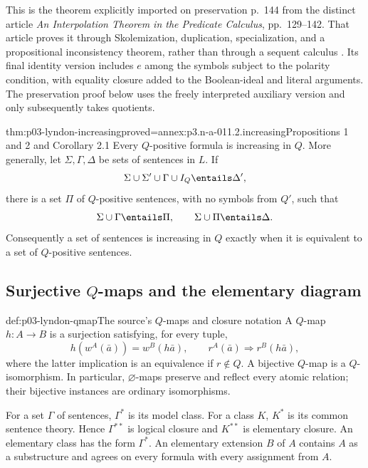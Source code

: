 This is the theorem explicitly imported on preservation p.~144 from the
distinct article \emph{An Interpolation Theorem in the Predicate Calculus},
pp.~129--142. That article proves it through Skolemization, duplication,
specialization, and a propositional inconsistency theorem, rather than
through a sequent calculus \cite[pp.~133--141]{Lyndon1959Interpolation}.
Its final identity version includes \(e\) among the symbols subject to
the polarity condition, with equality closure added to the Boolean-ideal
and literal arguments. The preservation proof below uses the freely
interpreted auxiliary version and only subsequently takes quotients.

\begin{hblemma}{thm:p03-lyndon-increasing}{proved=annex:p3.n-a-011.2.increasing}{Propositions 1 and 2 and Corollary 2.1}
Every \(Q\)-positive formula is increasing in \(Q\). More generally,
let \(\Sigma,\Gamma,\Delta\) be sets of sentences in \(L\). If
\[
 \Sigma\cup\Sigma'\cup\Gamma\cup I_Q\entails\Delta',
\]
there is a set \(\Pi\) of \(Q\)-positive sentences, with no symbols
from \(Q'\), such that
\[
 \Sigma\cup\Gamma\entails\Pi,
 \qquad \Sigma\cup\Pi\entails\Delta.
\]
Consequently a set of sentences is increasing in \(Q\) exactly when it
is equivalent to a set of \(Q\)-positive sentences.
\end{hblemma}

\subsection{Surjective \(Q\)-maps and the elementary diagram}

\begin{hbdefinition}{def:p03-lyndon-qmap}{The source's \(Q\)-maps and closure notation}
A \(Q\)-map \(h:A\to B\) is a surjection satisfying, for every tuple,
\[
 h(w^A(\bar a))=w^B(h\bar a),\qquad
 r^A(\bar a)\Rightarrow r^B(h\bar a),
\]
where the latter implication is an equivalence if \(r\notin Q\).
A bijective \(Q\)-map is a \(Q\)-isomorphism. In particular,
\(\varnothing\)-maps preserve and reflect every atomic relation;
their bijective instances are ordinary isomorphisms.

For a set \(\Gamma\) of sentences, \(\Gamma^*\) is its model class.
For a class \(K\), \(K^*\) is its common sentence theory. Hence
\(\Gamma^{**}\) is logical closure and \(K^{**}\) is elementary
closure. An elementary class has the form \(\Gamma^*\).
An elementary extension \(B\) of \(A\) contains \(A\) as a substructure
and agrees on every formula with every assignment from \(A\).
\end{hbdefinition}

